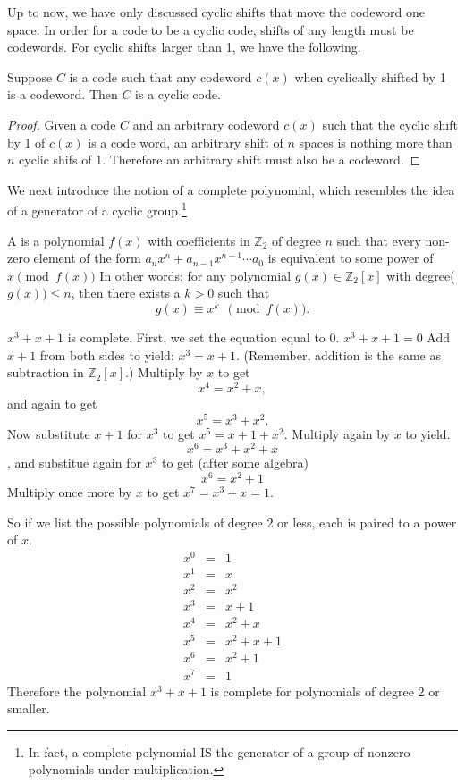Up to now, we have only discussed cyclic shifts that move the codeword one space.  In order for a code to be a cyclic code, shifts of any length must be codewords.  For cyclic shifts larger than 1, we have the following.

\begin {prop}{}
Suppose $C$ is a code such that any codeword $c(x)$ when cyclically shifted by 1 is a codeword. Then $C$ is a cyclic code.
\end {prop}
\begin {proof}
Given a code $C$ and an arbitrary codeword $c(x)$ such that the cyclic shift by 1 of $c(x)$ is a code word, an arbitrary shift of $n$ spaces is nothing more than $n$ cyclic shifs of 1.  Therefore an arbitrary shift must also be a codeword.
\end {proof}

We next introduce the notion of a complete polynomial, which resembles the idea of a generator of a cyclic group.\footnote{In fact, a complete polynomial IS the generator of a group of nonzero polynomials under multiplication.} 

\begin{defn}
A   is a polynomial $f(x)$ with coefficients in $\mathbb{Z}_2$ of degree $n$ such that every non-zero element of the form $a_nx^n + a_{n-1}x^{n-1} \cdots a_0$ is equivalent to some power of $x  \pmod{f(x)}$  In other words: for any polynomial $g(x) \in  
\mathbb{Z}_2[x]$ with degree($g(x)) \le n$, then there exists a $k >0$ such that
\[ g(x) \equiv x^k~~\pmod{f(x)}. \]
\end{defn}

\begin {example}{}
$x^3 + x + 1$ is complete.  First, we set the equation equal to 0. $x^3 + x + 1=0$ Add $x+1$ from both sides to yield: $x^3 = x+1$. (Remember, addition is the same as subtraction in $\mathbb{Z}_2[x]$.) Multiply by $x$ to get
\[x^4 = x^2 + x,\]
and again to get
\[x^5 = x^3 + x^2.\] 
Now substitute $x+1$ for $x^3$ to get $x^5 = x + 1 + x^2$. Multiply again by $x$ to yield.
\[x^6 = x^3 + x^2 + x\], 
and substitue again for $x^3$ to get (after some algebra)
\[x^6 = x^2 + 1\]
Multiply once more by $x$ to get $x^7 = x^3 + x = 1.$

So if we list the possible polynomials of degree 2 or less, each is paired to a power of $x$.
\[
\begin{array}{lcr}
x^0 & = & 1 \\
x^1 & = & x \\ 
x^2 & = & x^2 \\ 
x^3 & = & x+1 \\ 
x^4 & = & x^2 + x \\ 
x^5 & = & x^2 + x + 1 \\ 
x^6 & = & x^2 + 1 \\ 
x^7 & = & 1 
\end{array}\]
Therefore the polynomial $x^3 + x + 1$ is complete for polynomials of degree 2 or smaller.  
\end {example}

